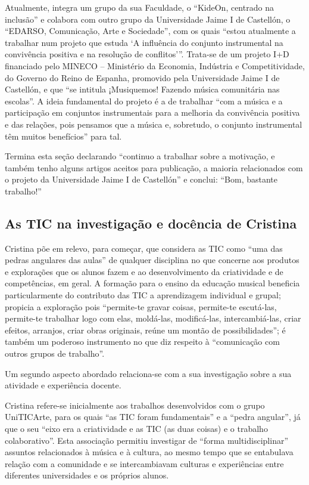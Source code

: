 \documentclass{textolivre}
\begin{document}
Atualmente, integra um grupo da sua Faculdade, o “KideOn, centrado na inclusão”
e colabora com outro grupo da Universidade Jaime I de Castellón, o “EDARSO,
Comunicação, Arte e Sociedade”, com os quais “estou atualmente a trabalhar num
projeto que estuda ‘A influência do conjunto instrumental na convivência
positiva e na resolução de conflitos’”. Trata-se de um projeto I+D financiado
pelo MINECO – Ministério da Economia, Indústria e Competitividade, do Governo
do Reino de Espanha, promovido pela Universidade Jaime I de Castellón, e que
“se intitula ¡Musiquemos! Fazendo música comunitária nas escolas”. A ideia
fundamental do projeto é a de trabalhar “com a música e a participação em
conjuntos instrumentais para a melhoria da convivência positiva e das relações,
pois pensamos que a música e, sobretudo, o conjunto instrumental têm muitos
benefícios” para tal.

Termina esta seção declarando “continuo a trabalhar sobre a motivação, e também
tenho alguns artigos aceitos para publicação, a maioria relacionados com o
projeto da Universidade Jaime I de Castellón” e conclui: “Bom, bastante
trabalho!”


\subsection{As TIC na investigação e docência de Cristina}\label{sec-tic}
Cristina põe em relevo, para começar, que considera as TIC como “uma das pedras
angulares das aulas” de qualquer disciplina no que concerne aos produtos e
explorações que os alunos fazem e ao desenvolvimento da criatividade e de
competências, em geral. A formação para o ensino da educação musical beneficia
particularmente do contributo das TIC a aprendizagem individual e grupal;
propicia a exploração pois “permite-te gravar coisas, permite-te escutá-las,
permite-te trabalhar logo com elas, moldá-las, modificá-las, intercambiá-las,
criar efeitos, arranjos, criar obras originais, reúne um montão de
possibilidades”; é também um poderoso instrumento no que diz respeito à
“comunicação com outros grupos de trabalho”.

Um segundo aspecto abordado relaciona-se com a sua investigação sobre a sua
atividade e experiência docente.

Cristina refere-se inicialmente aos trabalhos desenvolvidos com o grupo
UniTICArte, para os quais “as TIC foram fundamentais” e a “pedra angular”, já
que o seu “eixo era a criatividade e as TIC (as duas coisas) e o trabalho
colaborativo”. Esta associação permitiu investigar de “forma multidisciplinar”
assuntos relacionados à música e à cultura, ao mesmo tempo que se entabulava
relação com a comunidade e se intercambiavam culturas e experiências entre
diferentes universidades e os próprios alunos.
\end{document}
